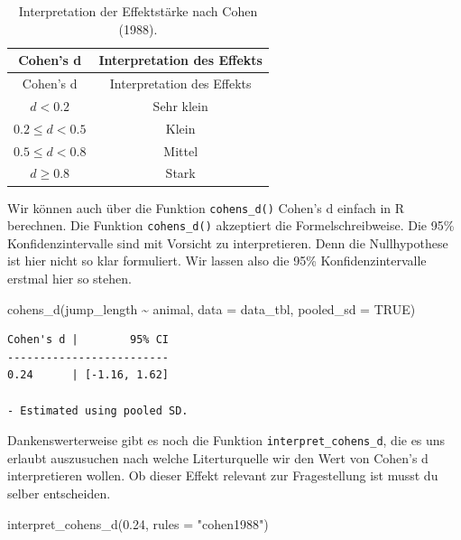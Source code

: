 \documentclass[
  letterpaper,
]{scrbook}
\newenvironment{Shaded}{\begin{snugshade}}{\end{snugshade}}
\newcommand{\AttributeTok}[1]{\textcolor[rgb]{0.40,0.45,0.13}{#1}}
\newcommand{\ConstantTok}[1]{\textcolor[rgb]{0.56,0.35,0.01}{#1}}
\newcommand{\FloatTok}[1]{\textcolor[rgb]{0.68,0.00,0.00}{#1}}
\newcommand{\FunctionTok}[1]{\textcolor[rgb]{0.28,0.35,0.67}{#1}}
\newcommand{\NormalTok}[1]{\textcolor[rgb]{0.00,0.23,0.31}{#1}}
\newcommand{\SpecialCharTok}[1]{\textcolor[rgb]{0.37,0.37,0.37}{#1}}
\newcommand{\StringTok}[1]{\textcolor[rgb]{0.13,0.47,0.30}{#1}}
\begin{document}
\hypertarget{tbl-cohen-d}{}
\begin{longtable}[]{@{}cc@{}}
\caption{\label{tbl-cohen-d}Interpretation der Effektstärke nach Cohen
(1988).}\tabularnewline
\toprule()
Cohen's d & Interpretation des Effekts \\
\midrule()
\endfirsthead
\toprule()
Cohen's d & Interpretation des Effekts \\
\midrule()
\endhead
\(d < 0.2\) & Sehr klein \\
\(0.2 \leq d < 0.5\) & Klein \\
\(0.5 \leq d < 0.8\) & Mittel \\
\(d \geq 0.8\) & Stark \\
\bottomrule()
\end{longtable}

Wir können auch über die Funktion \texttt{cohens\_d()} Cohen's d einfach
in R berechnen. Die Funktion \texttt{cohens\_d()} akzeptiert die
Formelschreibweise. Die 95\% Konfidenzintervalle sind mit Vorsicht zu
interpretieren. Denn die Nullhypothese ist hier nicht so klar
formuliert. Wir lassen also die 95\% Konfidenzintervalle erstmal hier so
stehen.

\begin{Shaded}
\begin{Highlighting}[]
\FunctionTok{cohens\_d}\NormalTok{(jump\_length }\SpecialCharTok{\textasciitilde{}}\NormalTok{ animal, }\AttributeTok{data =}\NormalTok{ data\_tbl, }\AttributeTok{pooled\_sd =} \ConstantTok{TRUE}\NormalTok{)}
\end{Highlighting}
\end{Shaded}

\begin{verbatim}
Cohen's d |        95% CI
-------------------------
0.24      | [-1.16, 1.62]

- Estimated using pooled SD.
\end{verbatim}

Dankenswerterweise gibt es noch die Funktion
\texttt{interpret\_cohens\_d}, die es uns erlaubt auszusuchen nach
welche Literturquelle wir den Wert von Cohen's d interpretieren wollen.
Ob dieser Effekt relevant zur Fragestellung ist musst du selber
entscheiden.

\begin{Shaded}
\begin{Highlighting}[]
\FunctionTok{interpret\_cohens\_d}\NormalTok{(}\FloatTok{0.24}\NormalTok{, }\AttributeTok{rules =} \StringTok{"cohen1988"}\NormalTok{)}
\end{Highlighting}
\end{Shaded}
\end{document}
